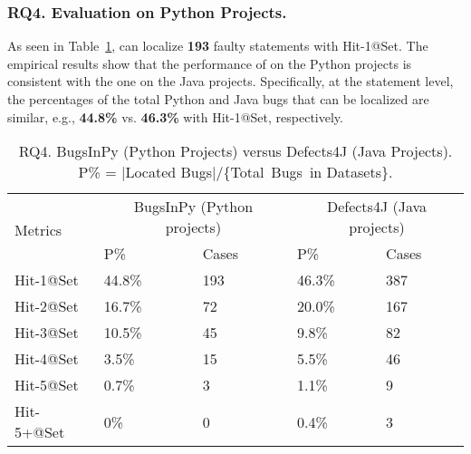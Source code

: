 \subsubsection{\bf RQ4. Evaluation on Python Projects.}
As seen in Table~\ref{RQ4}, {\tool} can localize {\bf 193} faulty
statements with Hit-1@Set. The empirical results show that the
performance of {\tool} on the Python projects is consistent with the
one on the Java projects. Specifically, at the statement level, the
percentages of the total Python and Java bugs that can be localized
are similar, e.g., {\bf 44.8\%} vs. {\bf 46.3\%} with Hit-1@Set,
respectively.



\begin{table}[t]
	\caption{RQ4. BugsInPy (Python Projects) versus Defects4J (Java Projects). P\% = $|$Located Bugs$|$/\{Total~Bugs~in Datasets\}.}
	\vspace{-5pt}
	{\footnotesize
		\begin{center}
			\tabcolsep 2.7pt
			\begin{tabular}{p{1.4cm}<{\centering}|p{1.55cm}<{\centering}p{1.55cm}<{\centering}|p{1.55cm}<{\centering}p{1.55cm}<{\centering}}\hline\cline{2-5}	
				
		\multirow{2}{*}{Metrics}& \multicolumn{2}{c|}{BugsInPy (Python projects)} & \multicolumn{2}{c}{Defects4J (Java projects)}\\\cline{2-5}
				           & P\%& Cases &P\%& Cases \\ \hline
				
				Hit-1@Set  &  44.8\%  &   193    & 46.3\%  &387\\ 
				\hline
				  
			    Hit-2@Set  &  16.7\%  &   72   & 20.0\%  &167\\
				\hline
				
				 
				Hit-3@Set  &  10.5\%  &  45     & 9.8\%  &82\\
				\hline
				
				Hit-4@Set  &  3.5\%  &   15    & 5.5\%  &46\\
				\hline
				
				Hit-5@Set  & 0.7\%   &   3    & 1.1\%  &9\\
				\hline
				
				Hit-5+@Set &  0\%  &   0    & 0.4\%  &3\\
				\hline
			\end{tabular}
			\label{RQ4}
		\end{center}
	}
\end{table}



